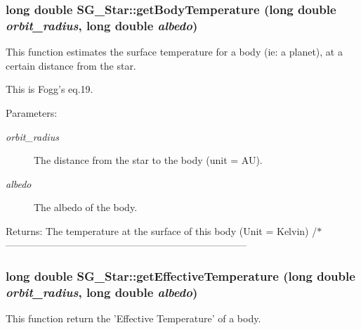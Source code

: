 \subsubsection{\setlength{\rightskip}{0pt plus 5cm}long double SG\_\-Star::get\-Body\-Temperature (long double {\em orbit\_\-radius}, long double {\em albedo})}\label{class_s_g___star_a9}


This function estimates the surface temperature for a body (ie: a planet), at a certain distance from the star. 

This is Fogg's eq.19. \begin{Desc}
\item[Parameters:]
\begin{description}
\item[{\em orbit\_\-radius}]The distance from the star to the body (unit = AU). \item[{\em albedo}]The albedo of the body. \end{description}
\end{Desc}
\begin{Desc}
\item[Returns:]The temperature at the surface of this body (Unit = Kelvin) /$\ast$-------------------------------------------------------------------------- \end{Desc}
\subsubsection{\setlength{\rightskip}{0pt plus 5cm}long double SG\_\-Star::get\-Effective\-Temperature (long double {\em orbit\_\-radius}, long double {\em albedo})}\label{class_s_g___star_a10}


This function return the 'Effective Temperature' of a body. 

